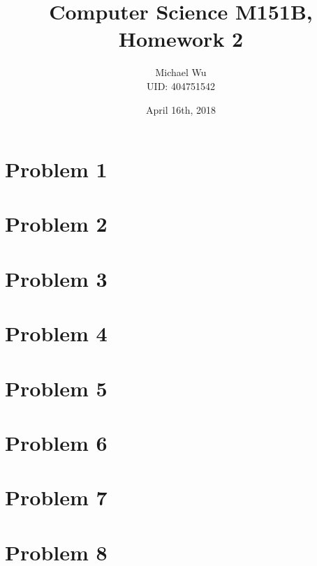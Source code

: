 \documentclass[12pt]{article}
\begin{document}
\title{Computer Science M151B, Homework 2}
\date{April 16th, 2018}
\author{Michael Wu\\UID: 404751542}
\maketitle

\section*{Problem 1}

\section*{Problem 2}

\section*{Problem 3}

\section*{Problem 4}

\section*{Problem 5}

\section*{Problem 6}

\section*{Problem 7}

\section*{Problem 8}
\end{document}
